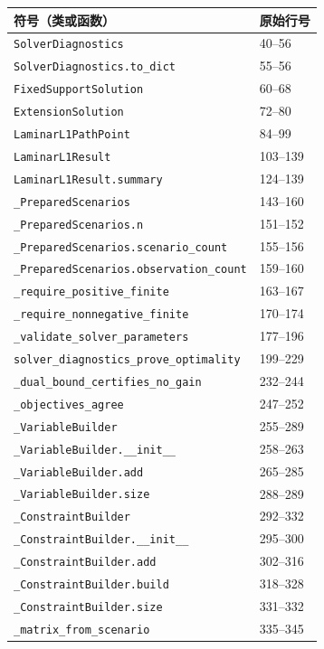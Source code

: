 \begin{longtable}{P{0.73\textwidth}P{0.18\textwidth}}\toprule 符号（类或函数） & 原始行号\\\midrule\endhead
\nolinkurl{SolverDiagnostics} & 40--56 \\
\nolinkurl{SolverDiagnostics.to_dict} & 55--56 \\
\nolinkurl{FixedSupportSolution} & 60--68 \\
\nolinkurl{ExtensionSolution} & 72--80 \\
\nolinkurl{LaminarL1PathPoint} & 84--99 \\
\nolinkurl{LaminarL1Result} & 103--139 \\
\nolinkurl{LaminarL1Result.summary} & 124--139 \\
\nolinkurl{_PreparedScenarios} & 143--160 \\
\nolinkurl{_PreparedScenarios.n} & 151--152 \\
\nolinkurl{_PreparedScenarios.scenario_count} & 155--156 \\
\nolinkurl{_PreparedScenarios.observation_count} & 159--160 \\
\nolinkurl{_require_positive_finite} & 163--167 \\
\nolinkurl{_require_nonnegative_finite} & 170--174 \\
\nolinkurl{_validate_solver_parameters} & 177--196 \\
\nolinkurl{solver_diagnostics_prove_optimality} & 199--229 \\
\nolinkurl{_dual_bound_certifies_no_gain} & 232--244 \\
\nolinkurl{_objectives_agree} & 247--252 \\
\nolinkurl{_VariableBuilder} & 255--289 \\
\nolinkurl{_VariableBuilder.__init__} & 258--263 \\
\nolinkurl{_VariableBuilder.add} & 265--285 \\
\nolinkurl{_VariableBuilder.size} & 288--289 \\
\nolinkurl{_ConstraintBuilder} & 292--332 \\
\nolinkurl{_ConstraintBuilder.__init__} & 295--300 \\
\nolinkurl{_ConstraintBuilder.add} & 302--316 \\
\nolinkurl{_ConstraintBuilder.build} & 318--328 \\
\nolinkurl{_ConstraintBuilder.size} & 331--332 \\
\nolinkurl{_matrix_from_scenario} & 335--345 \\

\end{longtable}
